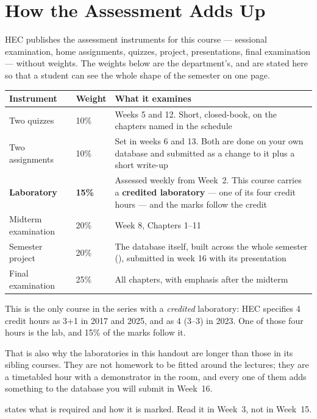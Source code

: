 \section{How the Assessment Adds Up}

HEC publishes the assessment instruments for this course --- sessional
examination, home assignments, quizzes, project, presentations, final
examination --- without weights. The weights below are the department's, and
are stated here so that a student can see the whole shape of the semester on
one page.

\begin{longtable}{@{}L{4.6cm}L{2.0cm}L{8.4cm}@{}}
\toprule
{}
\textbf{Instrument} & \textbf{Weight} & \textbf{What it examines} \\
\midrule
\endhead
Two quizzes & 10\% & Weeks 5 and 12. Short, closed-book, on the chapters named
in the schedule \\
Two assignments & 10\% & Set in weeks 6 and 13. Both are done on your own
database and submitted as a change to it plus a short write-up \\
\textbf{Laboratory} & \textbf{15\%} & Assessed weekly from Week~2. This course
carries a \textbf{credited laboratory} --- one of its four credit hours --- and
the marks follow the credit \\
Midterm examination & 20\% & Week 8, Chapters 1--11 \\
Semester project & 20\% & The database itself, built across the whole semester
(), submitted in week 16 with its presentation \\
Final examination & 25\% & All chapters, with emphasis after the midterm \\
\bottomrule
\end{longtable}

\begin{alertbox}
This is the only course in the series with a \emph{credited} laboratory: HEC
specifies 4 credit hours as 3+1 in 2017 and 2025, and as 4 (3--3) in 2023. One
of those four hours is the lab, and 15\% of the marks follow it.

\smallskip
That is also why the laboratories in this handout are longer than those in its
sibling courses. They are not homework to be fitted around the lectures; they
are a timetabled hour with a demonstrator in the room, and every one of them
adds something to the database you will submit in Week~16.

\smallskip
{} states what is required and how it is marked. Read it in
Week~3, not in Week~15.
\end{alertbox}
